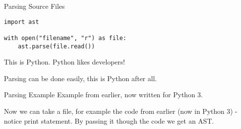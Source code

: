 \begin{frame}[fragile]{Parsing Source Files}
\begin{lstlisting}
import ast

with open("filename", "r") as file:
    ast.parse(file.read())
\end{lstlisting}

\vfill
This is Python. Python likes developers!
\end{frame}

Parsing can be done easily, this is Python after all.

\begin{frame}{Parsing Example}
Example from earlier, now written for Python 3.

\end{frame}

Now we can take a file, for example the code from earlier (now in Python 3) - notice print statement. By passing it though the code we get an AST.

